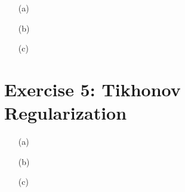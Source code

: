 \documentclass[unicode,11pt,a4paper,oneside,numbers=endperiod,openany]{scrartcl}
\begin{document}
\begin{itemize}
	\item [(a)] 
	\item [(b)] 
	\item [(c)]
\end{itemize}



\section*{Exercise 5: Tikhonov Regularization}

\begin{itemize}
	\item [(a)] 
	\item [(b)] 
	\item [(c)]
\end{itemize}


\end{document}
